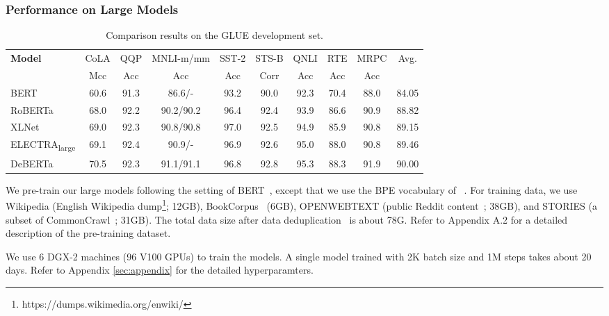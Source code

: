 \documentclass{article}
\newcommand\ModelName{DeBERTa}
\begin{document}
\subsubsection{Performance on Large Models}
\begin{table*}[htb!]
    \centering
    \begin{tabular}{@{\hskip3pt}l@{\hskip2pt}|@{\hskip2pt} c@{\hskip2pt}| @{\hskip2pt}c@{\hskip2pt}|c@{\hskip2pt}|c@{\hskip2pt}|c@{\hskip2pt}|c@{\hskip2pt}|c@{\hskip2pt}|c@{\hskip2pt}|c@{\hskip2pt}}
        \toprule
        \multirow{2}{*}{\bf Model} & {CoLA} &{QQP} &{MNLI-m/mm} &SST-2 &STS-B&QNLI&RTE&MRPC& Avg.\\ 
        & Mcc & Acc & Acc & Acc &Corr&Acc&Acc&Acc\\
        \midrule
        BERT &60.6 &91.3  & 86.6/- & 93.2 &90.0&92.3&70.4&88.0 &84.05 \\ \hline
        RoBERTa &68.0 & 92.2  & 90.2/90.2 & 96.4 &92.4&93.9&86.6&90.9& 88.82 \\ \hline
        XLNet& 69.0 & 92.3  & 90.8/90.8 & 97.0 &92.5&94.9&85.9&90.8 & 89.15 \\ \hline


ELECTRA\textsubscript{large}&69.1 & 92.4 &90.9/- &96.9& 92.6&95.0 & 88.0&90.8 &89.46 \\ \hline
        {\ModelName} &70.5 & 92.3 & 91.1/91.1 & 96.8 & 92.8 &95.3&88.3& 91.9 &90.00\\
        \bottomrule
        \end{tabular}
    \caption{
    Comparison results on the GLUE development set. 
    }
    \label{tab:glue}
    \vspace{-2mm}
\end{table*}






We pre-train our large models following the setting of BERT~\citep{devlin2018bert}, except that we use the BPE vocabulary of ~\cite{radford2019language,liu2019roberta}.
For training data, we use Wikipedia (English Wikipedia dump\footnote{https://dumps.wikimedia.org/enwiki/}; 12GB), BookCorpus~\citep{bookcorpus} (6GB), OPENWEBTEXT (public Reddit content~\citep{Gokaslan2019OpenWeb}; 38GB), and STORIES (a subset of CommonCrawl~\citep{trinh2018simple}; 31GB). 
The total data size after data deduplication~\citep{shoeybi2019megatron} is about 78G. 
Refer to Appendix A.2 for a detailed description of the pre-training dataset.

We use 6 DGX-2 machines (96 V100 GPUs) to train the models. 
A single model trained with 2K batch size and 1M steps takes about 20 days.
Refer to Appendix \ref{sec:appendix} for the detailed hyperparamters. 
\end{document}
